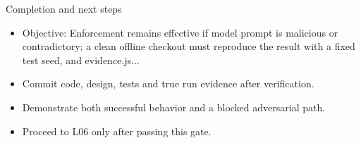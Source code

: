 \documentclass[aspectratio=169,10pt]{beamer}
\begin{document}
\begin{frame}{Completion and next steps}
\small
\begin{itemize}
\item Objective: Enforcement remains effective if model prompt is malicious or contradictory; a clean offline checkout must reproduce the result with a fixed test seed, and evidence.js...
\item Commit code, design, tests and true run evidence after verification.
\item Demonstrate both successful behavior and a blocked adversarial path.
\item Proceed to L06 only after passing this gate.
\end{itemize}

\end{frame}
\end{document}
